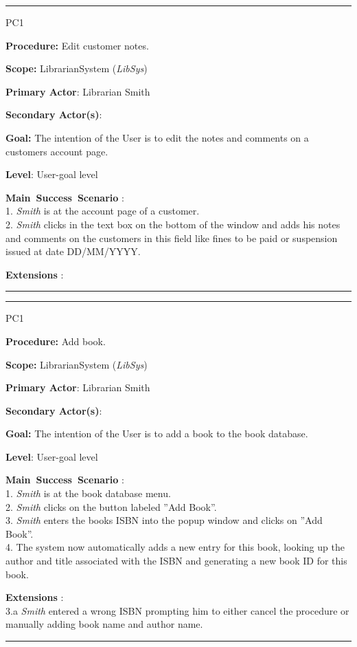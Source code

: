 
\vspace{0.5cm}
\hrule
\begin{lyxlist}{PC1}
\small{
\item [\textbf{Procedure:}] Edit customer notes.
\item [\textbf{Scope:}] LibrarianSystem (\emph{LibSys})
\item [\textbf{Primary Actor}:] Librarian Smith
\item [\textbf{Secondary Actor(s)}:] 
\item [\textbf{Goal:}] The intention of the User is to edit the notes and
comments on a customers account page.
\item [\textbf{Level}:] User-goal level
\item [\textbf{Main~Success~Scenario}]:\\
1. \emph{Smith} is at the account page of a customer.\\
2. \emph{Smith} clicks in the text box on the bottom of the window and adds his
notes and comments on the customers in this field like fines to be paid or
suspension issued at date DD/MM/YYYY.


\item [\textbf{Extensions}]:\\
}

\end{lyxlist}
\hrule


\vspace{0.5cm}
\hrule
\begin{lyxlist}{PC1}
\small{
\item [\textbf{Procedure:}] Add book.
\item [\textbf{Scope:}] LibrarianSystem (\emph{LibSys})
\item [\textbf{Primary Actor}:] Librarian Smith
\item [\textbf{Secondary Actor(s)}:] 
\item [\textbf{Goal:}] The intention of the User is to add a book to the
book database.
\item [\textbf{Level}:] User-goal level
\item [\textbf{Main~Success~Scenario}]:\\
1. \emph{Smith} is at the book database menu.\\
2. \emph{Smith} clicks on the button labeled ''Add Book''.\\
3. \emph{Smith} enters the books ISBN into the popup window and clicks on ''Add
Book''.\\
4. The system now automatically adds a new entry for this book, looking up the
author and title associated with the ISBN and generating a new book ID for this
book.\\


\item [\textbf{Extensions}]:\\
3.a \emph{Smith} entered a wrong ISBN prompting him to either cancel the
procedure or manually adding book name and author name.\\
}

\end{lyxlist}
\hrule


